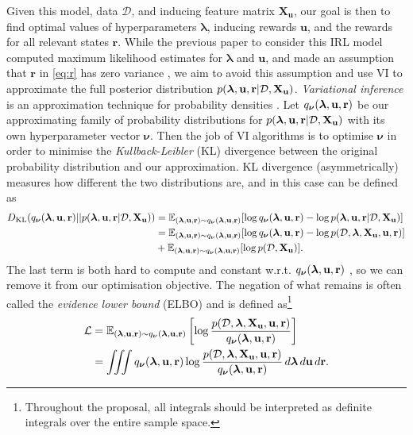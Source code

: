 \documentclass{mprop}
\theoremstyle{definition}
\begin{document}
Given this model, data $\mathcal{D}$, and inducing feature matrix
$\mathbf{X_u}$, our goal is then to find optimal values of hyperparameters
$\bm\lambda$, inducing rewards $\mathbf{u}$, and the rewards for all relevant
states $\mathbf{r}$. While the previous paper to consider this IRL model
computed maximum likelihood estimates for $\bm\lambda$ and $\mathbf{u}$, and
made an assumption that $\mathbf{r}$ in \eqref{eq:r} has zero variance
\cite{DBLP:conf/nips/LevinePK11}, we aim to avoid this assumption and use
VI to approximate the full posterior distribution $p(\bm\lambda, \mathbf{u}, \mathbf{r} | \mathcal{D}, \mathbf{X_u})$.
\emph{Variational inference} is an approximation technique for probability
densities \cite{blei2017variational}. Let $q_{\bm\nu}(\bm\lambda, \mathbf{u}, \mathbf{r})$ be our approximating
family of probability distributions for $p(\bm\lambda, \mathbf{u}, \mathbf{r} | \mathcal{D}, \mathbf{X_u})$ with its own hyperparameter
vector $\bm\nu$. Then the job of VI algorithms is to optimise $\bm\nu$ in order
to minimise the \emph{Kullback-Leibler} (KL) divergence between the original
probability distribution and our approximation.  KL divergence (asymmetrically)
measures how different the two distributions are, and in this case can be
defined as \cite{blei2017variational}
\[ \begin{split}
    D_{\mathrm{KL}}(q_{\bm\nu}(\bm\lambda, \mathbf{u}, \mathbf{r}) || p(\bm\lambda, \mathbf{u}, \mathbf{r} | \mathcal{D}, \mathbf{X_u})) &= \mathbb{E}_{(\bm\lambda, \mathbf{u}, \mathbf{r}) \sim q_{\bm\nu}(\bm\lambda, \mathbf{u}, \mathbf{r})} [\log q_{\bm\nu}(\bm\lambda, \mathbf{u}, \mathbf{r}) -
    \log p(\bm\lambda, \mathbf{u}, \mathbf{r} | \mathcal{D}, \mathbf{X_u}) ] \\
    &= \mathbb{E}_{(\bm\lambda, \mathbf{u}, \mathbf{r}) \sim q_{\bm\nu}(\bm\lambda, \mathbf{u}, \mathbf{r})}[\log q_{\bm\nu}(\bm\lambda, \mathbf{u}, \mathbf{r}) - \log p(\mathcal{D}, \bm\lambda, \mathbf{X_u}, \mathbf{u}, \mathbf{r})] \\
    &+ \mathbb{E}_{(\bm\lambda, \mathbf{u}, \mathbf{r}) \sim q_{\bm\nu}(\bm\lambda, \mathbf{u}, \mathbf{r})}[\log p(\mathcal{D}, \mathbf{X_u})].
  \end{split}
\]
The last term is both hard to compute and constant w.r.t. $q_{\bm\nu}(\bm\lambda, \mathbf{u}, \mathbf{r})$
\cite{blei2017variational}, so we can remove it from our optimisation objective.
The negation of what remains is often called the \emph{evidence lower bound}
(ELBO) and is defined as\footnote{Throughout the proposal, all integrals should
  be interpreted as definite integrals over the entire sample space.}
\cite{DBLP:books/lib/Bishop07,blei2017variational}
\begin{equation} \label{eq:elbo}
  \begin{split}
    \mathcal{L} &= \mathbb{E}_{(\bm\lambda, \mathbf{u}, \mathbf{r}) \sim q_{\bm\nu}(\bm\lambda, \mathbf{u}, \mathbf{r})} \left[ \log \frac{p(\mathcal{D}, \bm\lambda, \mathbf{X_u}, \mathbf{u}, \mathbf{r})}{q_{\bm\nu}(\bm\lambda, \mathbf{u}, \mathbf{r})}
    \right] \\
    &= \iiint q_{\bm\nu}(\bm\lambda, \mathbf{u}, \mathbf{r}) \log
    \frac{p(\mathcal{D}, \bm\lambda, \mathbf{X_u}, \mathbf{u}, \mathbf{r})}{q_{\bm\nu}(\bm\lambda, \mathbf{u}, \mathbf{r})}\,d\bm\lambda\,d\mathbf{u}\,d\mathbf{r}.
  \end{split}
\end{equation}
\end{document}
